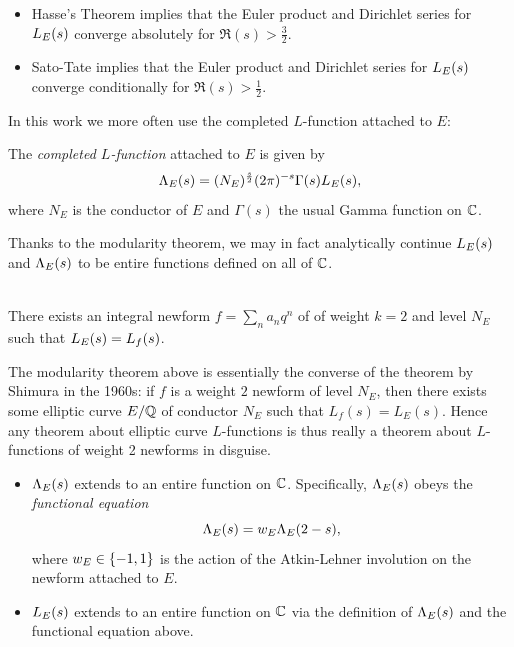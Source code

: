 \begin{corollary} \mbox{}
\begin{itemize}
\item Hasse's Theorem implies that the Euler product and Dirichlet series for $L_E(s)$ converge absolutely for $\Re(s) > \frac{3}{2}$.
\item Sato-Tate implies that the Euler product and Dirichlet series for $L_E(s)$ converge conditionally for $\Re(s) > \frac{1}{2}$.
\end{itemize}
\end{corollary}

In this work we more often use the completed $L$-function attached to $E$:
\begin{definition}
The {\it completed $L$-function} attached to $E$ is given by
\begin{equation}
\Lambda_E(s) = (N_E)^{\frac{s}{2}}(2\pi)^{-s}\Gamma(s)L_E(s),
\end{equation}
where $N_E$ is the conductor of $E$ and $\Gamma(s)$ the usual Gamma function on $\mathbb{C}$.
\end{definition}

Thanks to the modularity theorem, we may in fact analytically continue $L_E(s)$ and $\Lambda_E(s)$ to be entire functions defined on all of $\mathbb{C}$.
\begin{theorem} \mbox{}\\
There exists an integral newform $f = \sum_n a_n q^n$ of of weight $k=2$ and level $N_E$ such that $L_E(s) = L_f(s)$.
\end{theorem}

The modularity theorem above is essentially the converse of the theorem by Shimura in the 1960s: if $f$ is a weight $2$ newform of level $N_E$, then there exists some elliptic curve $E/\mathbb{Q}$ of conductor $N_E$ such that $L_f(s) = L_E(s)$. Hence any theorem about elliptic curve $L$-functions is thus really a theorem about $L$-functions of weight 2 newforms in disguise. \\

\begin{corollary} \mbox{}
\begin{itemize}
\item $\Lambda_E(s)$ extends to an entire function on $\mathbb{C}$. Specifically, $\Lambda_E(s)$ obeys the {\it functional equation}
\begin{equation}
\Lambda_E(s) = w_E \Lambda_E(2-s),
\end{equation}
where $w_E \in \left\{-1, 1\right\}$ is the action of the Atkin-Lehner involution on the newform attached to $E$.
\item $L_E(s)$ extends to an entire function on $\mathbb{C}$ via the definition of $\Lambda_E(s)$ and the functional equation above.
\end{itemize}
\end{corollary}

